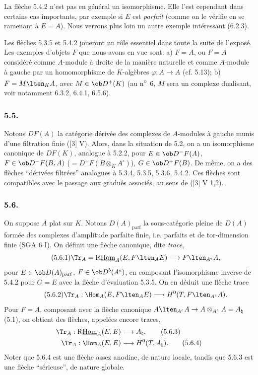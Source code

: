 La flèche 5.4.2 n'est pas en général un isomorphisme. Elle l'est cependant dans certains cas importants, par exemple si $E$ est \emph{parfait} (comme on le vérifie en se ramenant à $E=A$). Nous verrons plus loin un autre exemple intéressant (6.2.3).

Les flèches 5.3.5 et 5.4.2 joueront un rôle essentiel dans toute la suite de l'exposé. Les exemples d'objets $F$ que nous avons en vue sont: a) $F=A$, ou $F=A$ considéré comme $A$-module à droite de la manière naturelle et comme $A$-module à gauche par un homomorphisme de $K$-algèbres $\varphi:A\to A$ (cf. 5.13); b) $F=M\lten_KA$, avec $M\in\ob D^+(K)$ (au n\textsuperscript{o}~6, $M$ sera un complexe dualisant, voir notamment 6.3.2, 6.4.1, 6.5.6).

\subsubsection*{5.5.}

Notons $DF(A)$ la catégorie dérivée des complexes de $A$-modules à gauche munis d'une filtration finie ([3] V). Alors, dans la situation de 5.2, on a un isomorphisme canonique de $DF(K)$, analogue à 5.2.2, pour $E\in\ob D^-F(A)$, $F\in\ob D^-F(B,A)$ ($=D^-F(B\otimes_KA^\circ)$), $G\in\ob D^+F(B)$. De même, on a des flèches ``dérivées filtrées'' analogues à 5.3.4, 5.3.5, 5.3.6, 5.4.2. Ces flèches sont compatibles avec le passage aux gradués associés, au sens de ([3] V 1,2).

\subsubsection*{5.6.}

On suppose $A$ plat sur $K$. Notons $D(A)_{\mathrm{parf}}$ la sous-catégorie pleine de $D(A)$ formée des complexes d'amplitude parfaite finie, i.e. parfaits et de tor-dimension finie (SGA 6 I). On définit une flèche canonique, dite \emph{trace},
\begin{equation}\tag{5.6.1}
\Tr_A=\mathrm{R}\underline{\mathrm{Hom}}_A(E,F\lten_AE)\longrightarrow F\lten_{A^e}A,
\end{equation}
pour $E\in\ob D(A)_{\mathrm{parf}}$, $F\in\ob D^b(A^e)$, en composant l'isomorphisme inverse de 5.4.2 pour $G=E$ avec la flèche d'évaluation 5.3.5. On en déduit une flèche trace
\begin{equation}\tag{5.6.2}
\Tr_A:\Hom_A(E,F\lten_AE)\longrightarrow H^0(T,F\lten_{A^e}A).
\end{equation}
Pour $F=A$, composant avec la flèche canonique $A\lten_{A^e}A\to A\otimes_{A^e}A=A_\natural$ (5.1), on obtient des flèches, appelées encore traces,
\begin{align}
\Tr_A:\mathrm{R}\underline{\mathrm{Hom}}_A(E,E)&\longrightarrow A_\natural,\tag{5.6.3}\\
\Tr_A:\Hom_A(E,E)&\longrightarrow H^0(T,A_\natural).\tag{5.6.4}
\end{align}
Noter que 5.6.4 est une flèche assez anodine, de nature locale, tandis que 5.6.3 est une flèche ``sérieuse'', de nature globale.

